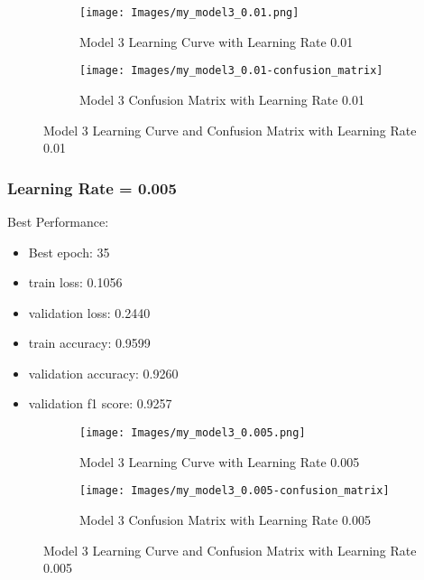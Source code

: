 \documentclass{article}
\begin{document}
\begin{figure}[h]
    \begin{subfigure}{0.5\textwidth}
        \texttt{[image: Images/my\_model3\_0.01.png]} 
        \caption{Model 3 Learning Curve with Learning Rate 0.01}
        \label{fig:model3_lr_0.01}
    \end{subfigure}
    \begin{subfigure}{0.5\textwidth}
        \texttt{[image: Images/my\_model3\_0.01-confusion\_matrix]} 
        \caption{Model 3 Confusion Matrix with Learning Rate 0.01}
        \label{fig:model3_lr_0.01_confusion_matrix}
    \end{subfigure}
    \caption{Model 3 Learning Curve and Confusion Matrix with Learning Rate 0.01}
    \label{fig:model3_lr_0.01_combined}
\end{figure}

\subsubsection{Learning Rate = 0.005}
Best Performance:
\begin{itemize}
    \item Best epoch: 35
    \item train loss: 0.1056
    \item validation loss: 0.2440
    \item train accuracy: 0.9599
    \item validation accuracy: 0.9260
    \item validation f1 score: 0.9257
\end{itemize}

\begin{figure}[h]
    \begin{subfigure}{0.5\textwidth}
        \texttt{[image: Images/my\_model3\_0.005.png]} 
        \caption{Model 3 Learning Curve with Learning Rate 0.005}
        \label{fig:model3_lr_0.005}
    \end{subfigure}
    \begin{subfigure}{0.5\textwidth}
        \texttt{[image: Images/my\_model3\_0.005-confusion\_matrix]} 
        \caption{Model 3 Confusion Matrix with Learning Rate 0.005}
        \label{fig:model3_lr_0.005_confusion_matrix}
    \end{subfigure}
    \caption{Model 3 Learning Curve and Confusion Matrix with Learning Rate 0.005}
    \label{fig:model3_lr_0.005_combined}
\end{figure}
\end{document}

